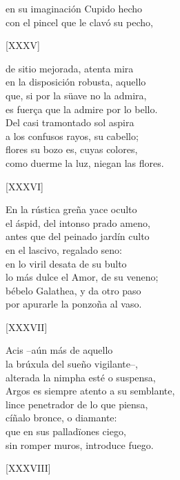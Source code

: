 \documentclass[11pt,a4paper,twoside]{article}
\begin{document}
en su imaginación Cupido hecho\\
con el pincel que le clavó su pecho,\par\pend
%
\begin{center}
	[XXXV]
\end{center}\pstart
de sitio mejorada, atenta mira\\
en la disposición robusta, aquello\\
que, si por la süave no la admira,\\
es fuerça que la admire por lo bello.\\
Del casi tramontado sol aspira\\
a los confusos rayos, su cabello;\\
flores su bozo es, cuyas colores,\\
como duerme la luz, niegan las flores.\par\pend
%
\begin{center}
	[XXXVI]
\end{center}\pstart
En la rústica greña yace oculto\\
el áspid, del intonso prado ameno,\\
antes que del peinado jardín culto\\
en el lascivo, regalado seno:\\
en lo viril desata de su bulto\\
lo más dulce el Amor, de su veneno;\\
bébelo Galathea, y da otro paso\\
por apurarle la ponzoña al vaso.\par\pend
%
\begin{center}
	[XXXVII]
\end{center}\pstart
Acis --aún más de aquello \\
la brúxula del sueño vigilante--,\\
alterada la nimpha esté o suspensa,\\
Argos es siempre atento a su semblante,\\
lince penetrador de lo que piensa,\\
cíñalo bronce, o  diamante:\\
que en sus palladïones  ciego,\\
sin romper muros, introduce fuego.\par\pend 
%
\begin{center}
	[XXXVIII]
\end{center}\pstart
\end{document}
